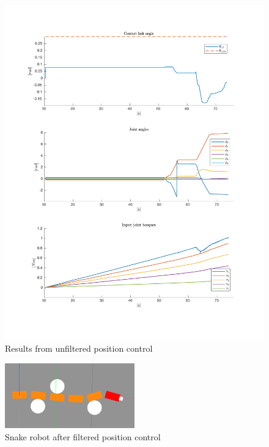 \begin{figure}
    \centering
    
    \includegraphics[trim=2cm 2cm 2cm 2cm, clip=true, width=\textwidth]{figures/experiments/single_pos/single-pos-3plot-fail.pdf}

    \caption{Results from unfiltered position control}
    \label{fig:singlepos-nofilter}
\end{figure}

\begin{figure}
    \centering
    \includegraphics[width=0.5\textwidth]{figures/experiments/single_pos/gazebo_single_pos.png}
    \caption{Snake robot after filtered position control}
    \label{fig:singlepos-gazebo}
\end{figure}

